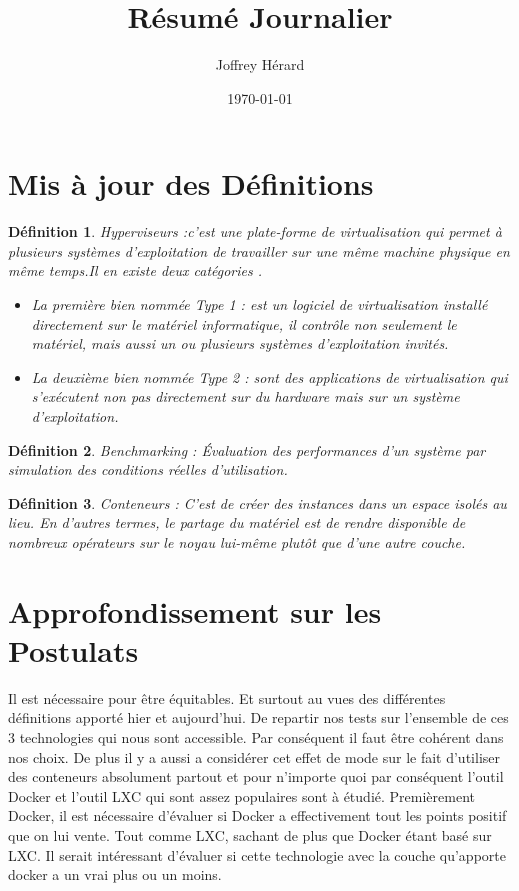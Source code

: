 \documentclass[french]{article}
\newtheorem{mydef}{Définition}
\begin{document}
\title{Résumé Journalier}
\author{Joffrey Hérard}
\date{\today} 

\maketitle

\section{Mis à jour  des Définitions}
\begin{mydef}
Hyperviseurs :c'est une plate-forme de virtualisation qui permet à plusieurs systèmes d'exploitation de travailler sur une même machine physique en même temps.Il en existe deux catégories .
	\begin{itemize}
		\item La première bien nommée Type 1 :  est un logiciel de virtualisation installé directement sur le matériel informatique, il contrôle non seulement le matériel, mais aussi un ou plusieurs systèmes d'exploitation invités.
		\item La deuxième bien nommée Type 2 : sont des applications de virtualisation qui s’exécutent non pas directement sur du hardware mais sur un système d’exploitation.
	\end{itemize}
\end{mydef}
\begin{mydef}
Benchmarking : Évaluation des performances d'un système par simulation des conditions réelles d'utilisation. 
\end{mydef}
\begin{mydef}
Conteneurs : C'est de créer des instances dans un espace isolés au lieu. En d'autres termes, le partage du matériel est de rendre disponible de nombreux opérateurs sur le noyau lui-même plutôt que d'une autre couche. 
\end{mydef}
\section{Approfondissement sur les Postulats}
Il est nécessaire pour être équitables. Et surtout au vues des différentes définitions apporté hier et aujourd'hui. De repartir nos tests sur l'ensemble de ces 3 technologies qui nous sont accessible. Par conséquent il faut être cohérent dans nos choix. De plus il y a aussi a considérer cet effet de mode sur le fait d'utiliser des conteneurs absolument partout et pour n'importe quoi par conséquent l’outil Docker et l'outil LXC qui sont assez populaires sont à étudié. Premièrement Docker, il est nécessaire d'évaluer si Docker a effectivement tout les points positif que on lui vente. Tout comme LXC, sachant de plus que Docker étant basé sur LXC. Il serait intéressant d’évaluer si cette technologie avec la couche qu'apporte docker a un vrai plus ou un moins.
\end{document}
